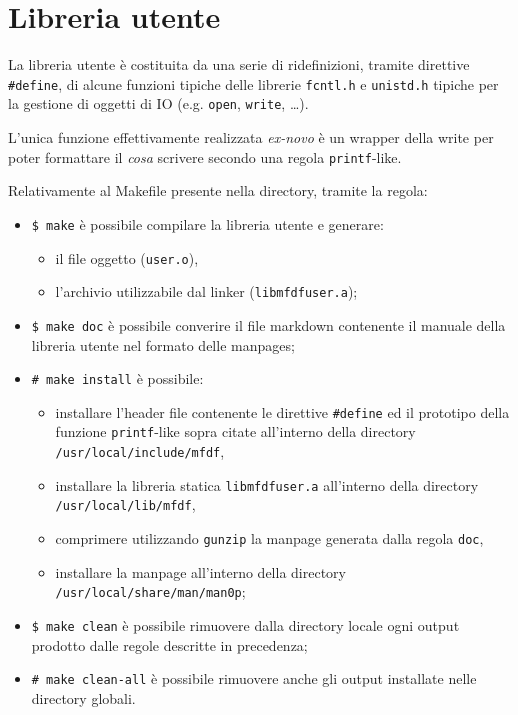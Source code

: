 \documentclass{article}
\newcommand{\terminal}[1]{\colorbox{tn-bg}{\textcolor{tn-fg}{\texttt{#1}}}}
\begin{document}
\section{Libreria utente}
La libreria utente è costituita da una serie di ridefinizioni, tramite direttive \texttt{\#define}, di alcune funzioni tipiche delle librerie \texttt{fcntl.h} e \texttt{unistd.h} tipiche per la gestione di oggetti di IO (e.g. \texttt{open}, \texttt{write}, \dots).

L'unica funzione effettivamente realizzata \textit{ex-novo} è un wrapper della write per poter formattare il \textit{cosa} scrivere secondo una regola \texttt{printf}-like.

Relativamente al Makefile presente nella directory, tramite la regola:
\begin{itemize}
        \item \terminal{\$ make} è possibile compilare la libreria utente e generare:
                \begin{itemize}
                        \item il file oggetto (\texttt{user.o}),
                        \item l'archivio utilizzabile dal linker (\texttt{libmfdfuser.a});
                \end{itemize}
        \item \terminal{\$ make doc} è possibile converire il file markdown contenente il manuale della libreria utente nel formato delle manpages;
        \item \terminal{\# make install} è possibile:
                \begin{itemize}
                        \item installare l'header file contenente le direttive \texttt{\#define} ed il prototipo della funzione \texttt{printf}-like sopra citate all'interno della directory \texttt{/usr/local/include/mfdf},
                        \item installare la libreria statica \texttt{libmfdfuser.a} all'interno della directory \texttt{/usr/local/lib/mfdf},
                        \item comprimere utilizzando \texttt{gunzip} la manpage generata dalla regola \texttt{doc},
                        \item installare la manpage all'interno della directory \texttt{/usr/local/share/man/man0p};
                \end{itemize}
        \item \terminal{\$ make clean} è possibile rimuovere dalla directory locale ogni output prodotto dalle regole descritte in precedenza;
        \item \terminal{\# make clean-all} è possibile rimuovere anche gli output installate nelle directory globali.
\end{itemize}
\end{document}
